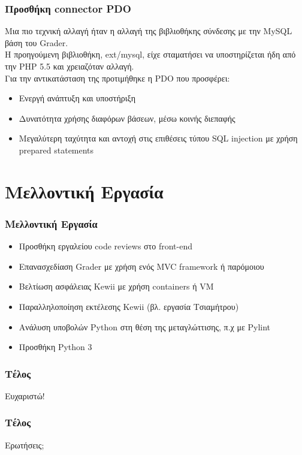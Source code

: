 \documentclass{beamer}
\begin{document}
\begin{frame}
  \frametitle{Προσθήκη connector PDO}

  Μια πιο τεχνική αλλαγή ήταν η αλλαγή της βιβλιοθήκης σύνδεσης με την MySQL βάση
  του Grader.\\[0.3cm]

  Η προηγούμενη βιβλιοθήκη, ext/mysql, είχε σταματήσει να υποστηρίζεται ήδη από
  την PHP 5.5 και χρειαζόταν αλλαγή.\\[0.3cm]

  Για την αντικατάσταση της προτιμήθηκε η PDO που προσφέρει:

  \begin{itemize}
      \item Ενεργή ανάπτυξη και υποστήριξη
      \item Δυνατότητα χρήσης διαφόρων βάσεων, μέσω κοινής διεπαφής
      \item Μεγαλύτερη ταχύτητα και αντοχή στις επιθέσεις τύπου SQL injection με
        χρήση prepared statements
  \end{itemize}
\end{frame}

\section{Μελλοντική Εργασία}
\begin{frame}
  \frametitle{Μελλοντική Εργασία}
  \begin{itemize}
      \item Προσθήκη εργαλείου code reviews στο front-end
      \item Επανασχεδίαση Grader με χρήση ενός MVC framework ή παρόμοιου
      \item Βελτίωση ασφάλειας Kewii με χρήση containers ή VM
      \item Παραλληλοποίηση εκτέλεσης Kewii (βλ. εργασία Τσιαμήτρου)
      \item Ανάλυση υποβολών Python στη θέση της μεταγλώττισης, π.χ με Pylint
      \item Προσθήκη Python 3
  \end{itemize}
\end{frame}

\begin{frame}
  \frametitle{Τέλος}
  \centering
  Ευχαριστώ!
\end{frame}

\begin{frame}
  \frametitle{Τέλος}
  \centering
  Ερωτήσεις;
\end{frame}
\end{document}
